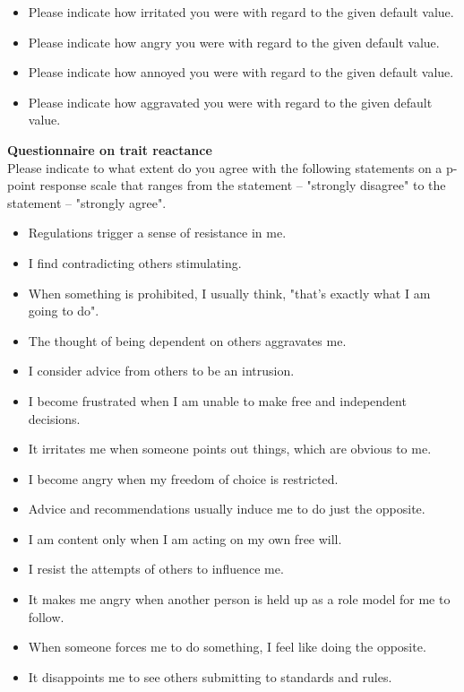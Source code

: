 \documentclass[review, authoryear,12pt]{elsarticle}
\begin{document}
\begin{itemize}
\item Please indicate how irritated you were with regard to the given default value.
\item Please indicate how angry you were with regard to the given default value.
\item Please indicate how annoyed you were with regard to the given default value.
\item Please indicate how aggravated you were with regard to the given default value. \\
\end{itemize}


\textbf{Questionnaire on trait reactance} \\

Please indicate to what extent do you agree with the following statements on a p-point response scale that ranges from the statement – "strongly disagree" to the statement – "strongly agree". \\

\begin{itemize}
\item Regulations trigger a sense of resistance in me.
\item I find contradicting others stimulating.
\item When something is prohibited, I usually think, "that's exactly what I am going to do".
\item The thought of being dependent on others aggravates me.
\item I consider advice from others to be an intrusion.
\item I become frustrated when I am unable to make free and independent decisions.
\item It irritates me when someone points out things, which are obvious to me.
\item I become angry when my freedom of choice is restricted.
\item Advice and recommendations usually induce me to do just the opposite.
\item I am content only when I am acting on my own free will.
\item I resist the attempts of others to influence me.
\item It makes me angry when another person is held up as a role model for me to follow.
\item When someone forces me to do something, I feel like doing the opposite.
\item It disappoints me to see others submitting to standards and rules.
\end{itemize}
\end{document}
